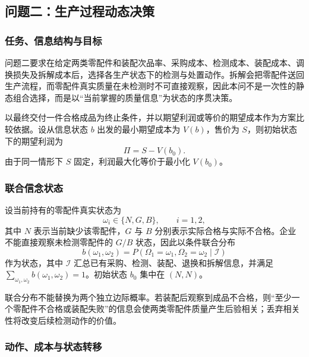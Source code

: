 \subsection{问题二：生产过程动态决策}

\subsubsection{任务、信息结构与目标}

问题二要求在给定两类零配件和装配次品率、采购成本、检测成本、装配成本、调换损失及拆解成本后，选择各生产状态下的检测与处置动作。拆解会把零配件送回生产流程，而零配件真实质量在未检测时不可直接观察，因此本问不是一次性的静态组合选择，而是以“当前掌握的质量信息”为状态的序贯决策。

以最终交付一件合格成品为终止条件，并以期望利润或等价的期望成本作为方案比较依据。设从信息状态 $b$ 出发的最小期望成本为 $V(b)$，售价为 $S$，则初始状态下的期望利润为
\begin{equation}
  \Pi=S-V(b_0).
  \label{eq:q2-profit}
\end{equation}
由于同一情形下 $S$ 固定，利润最大化等价于最小化 $V(b_0)$。

\subsubsection{联合信念状态}

设当前持有的零配件真实状态为
\begin{equation}
  \omega_i\in\{N,G,B\},\qquad i=1,2,
  \label{eq:q2-hidden-quality}
\end{equation}
其中 $N$ 表示当前缺少该零配件，$G$ 与 $B$ 分别表示实际合格与实际不合格。企业不能直接观察未检测零配件的 $G/B$ 状态，因此以条件联合分布
\begin{equation}
  b(\omega_1,\omega_2)
  =P(\Omega_1=\omega_1,\Omega_2=\omega_2\mid\mathcal I)
  \label{eq:q2-belief-state}
\end{equation}
作为状态，其中 $\mathcal I$ 汇总已有采购、检测、装配、退换和拆解信息，并满足 $\sum_{\omega_1,\omega_2}b(\omega_1,\omega_2)=1$。初始状态 $b_0$ 集中在 $(N,N)$。

联合分布不能替换为两个独立边际概率。若装配后观察到成品不合格，则“至少一个零配件不合格或装配失败”的信息会使两类零配件质量产生后验相关；丢弃相关性将改变后续检测动作的价值。

\subsubsection{动作、成本与状态转移}

